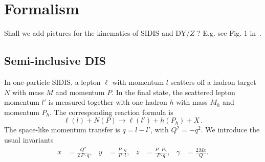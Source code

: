 \documentclass[aps,preprintnumbers,showpacs,nofootinbib,superscriptaddress,floatfix]{revtex4}
\newcommand{\AS}[1]{{\textcolor[rgb]{1,0,1}{#1}}}
\begin{document}
\section{Formalism}
\label{s:theory}

\AS{Shall we add pictures for the kinematics of SIDIS and DY/$Z$ ? E.g. see Fig. 1 in~\cite{Signori:2013mda}.}

\subsection{Semi-inclusive DIS}
\label{ss:SIDIS_formalism}

In one-particle SIDIS, a lepton $\ell$ with momentum $l$ scatters 
off a hadron target $N$ with mass $M$ and momentum
$P$. In the final state, the scattered lepton momentum 
$l'$ is measured together with
one hadron $h$ with mass $M_h$
and momentum $P_h$. The corresponding reaction formula is  
\begin{equation}
  \label{e:sidis}
\ell(l) + N(P) \to \ell(l') + h(P_h) + X \, .
\end{equation}
The space-like momentum transfer is $q = l - l'$, with $Q^2 = - q^2$. We
introduce the usual invariants  
\begin{align}
  \label{e:xyz}
x &= \frac{Q^2}{2\,P\cdot q},
&
y &= \frac{P \cdot q}{P \cdot l},
&
z &= \frac{P \cdot P_h}{P\cdot q},
&
\gamma &= \frac{2 M x}{Q} .
\end{align}
\end{document}
